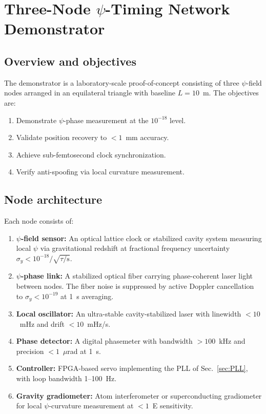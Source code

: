 \documentclass[aps,prd,twocolumn,superscriptaddress,nofootinbib]{revtex4-2}
\begin{document}
\section{Three-Node $\psi$-Timing Network
Demonstrator}\label{sec:demonstrator}

\subsection{Overview and objectives}\label{sec:demo-overview}

The demonstrator is a laboratory-scale proof-of-concept consisting of
three $\psi$-field nodes arranged in an equilateral triangle with
baseline $L = 10$~m. The objectives are:
\begin{enumerate}
\item Demonstrate $\psi$-phase measurement at the $10^{-18}$ level.
\item Validate position recovery to $< 1$~mm accuracy.
\item Achieve sub-femtosecond clock synchronization.
\item Verify anti-spoofing via local curvature measurement.
\end{enumerate}

\subsection{Node architecture}\label{sec:node-arch}

Each node consists of:
\begin{enumerate}
\item \textbf{$\psi$-field sensor:} An optical lattice clock or
stabilized cavity system measuring local $\psi$ via gravitational
redshift at fractional frequency uncertainty
$\sigma_y < 10^{-18}/\sqrt{\tau/\mathrm{s}}$.
\item \textbf{$\psi$-phase link:} A stabilized optical fiber
carrying phase-coherent laser light between nodes. The fiber noise
is suppressed by active Doppler cancellation to
$\sigma_y < 10^{-19}$ at 1~s averaging.
\item \textbf{Local oscillator:} An ultra-stable cavity-stabilized
laser with linewidth $< 10$~mHz and drift $< 10$~mHz/s.
\item \textbf{Phase detector:} A digital phasemeter with bandwidth
$> 100$~kHz and precision $< 1$~$\mu$rad at 1~s.
\item \textbf{Controller:} FPGA-based servo implementing the PLL
of Sec.~\ref{sec:PLL}, with loop bandwidth 1--100~Hz.
\item \textbf{Gravity gradiometer:} Atom interferometer or
superconducting gradiometer for local $\psi$-curvature measurement
at $< 1$~E sensitivity.
\end{enumerate}
\end{document}
